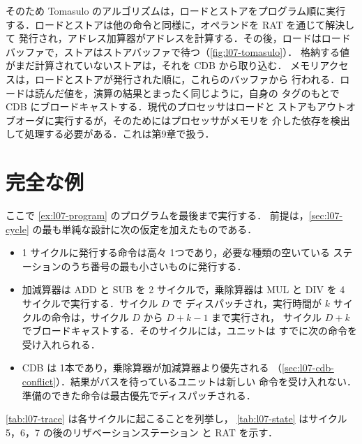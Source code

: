 \documentclass[../main.tex]{subfiles}
\begin{document}
そのため Tomasulo のアルゴリズムは，ロードとストアをプログラム順に実行
する．ロードとストアは他の命令と同様に，オペランドを RAT を通じて解決して
発行され，アドレス加算器がアドレスを計算する．その後，ロードはロード
バッファで，ストアはストアバッファで待つ（\cref{fig:l07-tomasulo}）．
格納する値がまだ計算されていないストアは，それを CDB から取り込む．
メモリアクセスは，ロードとストアが発行された順に，これらのバッファから
行われる．ロードは読んだ値を，演算の結果とまったく同じように，自身の
タグのもとで CDB にブロードキャストする．現代のプロセッサはロードと
ストアもアウトオブオーダに実行するが，そのためにはプロセッサがメモリを
介した依存を検出して処理する必要がある．これは第9章で扱う．

\section{完全な例}
\label{sec:l07-example}

ここで \cref{ex:l07-program} のプログラムを最後まで実行する．
前提は，\cref{sec:l07-cycle}
の最も単純な設計に次の仮定を加えたものである．
\begin{itemize}
  \item 1 サイクルに発行する命令は高々 1つであり，必要な種類の空いている
    ステーションのうち番号の最も小さいものに発行する．
  \item 加減算器は ADD と SUB を 2 サイクルで，乗除算器は MUL と DIV を
    4 サイクルで実行する．サイクル $D$ で
    ディスパッチされ，実行時間が
    $k$ サイクルの命令は，サイクル $D$ から $D+k-1$ まで実行され，
    サイクル $D+k$ でブロードキャストする．そのサイクルには，ユニットは
    すでに次の命令を受け入れられる．
  \item CDB は 1本であり，乗除算器が加減算器より優先される
    （\cref{sec:l07-cdb-conflict}）．結果がバスを待っているユニットは新しい
    命令を受け入れない．準備のできた命令は最古優先でディスパッチされる．
\end{itemize}
\cref{tab:l07-trace} は各サイクルに起こることを列挙し，
\cref{tab:l07-state} はサイクル 5，6，7 の後のリザベーションステーション
と RAT を示す．
\end{document}
